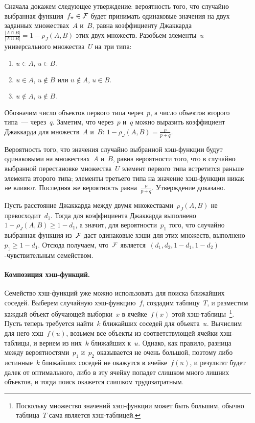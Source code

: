 \documentclass[12pt,fleqn]{article}
\begin{document}
Сначала докажем следующее утверждение: вероятность того, что случайно
выбранная функция~$f_\pi \in \mathcal{F}$ будет принимать одинаковые значения
на двух заданных множествах~$A$ и~$B$, равна коэффициенту
Джаккарда~$\frac{|A \cap B|}{|A \cup B|} = 1 - \rho_J(A, B)$ этих
двух множеств.
Разобьем элементы~$u$ универсального множества~$U$ на три типа:
\begin{enumerate}
    \item $u \in A$, $u \in B$.
    \item $u \in A$, $u \notin B$ или $u \notin A$, $u \in B$.
    \item $u \notin A$, $u \notin B$.
\end{enumerate}
Обозначим число объектов первого типа через~$p$, а число объектов второго типа~--- через~$q$.
Заметим, что через~$p$ и~$q$ можно выразить коэффициент Джаккарда для
множеств~$A$ и~$B$: $1 - \rho_J(A, B) = \frac{p}{p + q}$.

Вероятность того, что значения случайно выбранной хэш-функции будут одинаковыми
на множествах~$A$ и~$B$, равна вероятности того, что в случайно выбранной перестановке
множества~$U$ элемент первого типа встретится раньше элемента второго типа;
элементы третьего типа на значение хэш-функции никак не влияют.
Последняя же вероятность равна~$\frac{p}{p + q}$.
Утверждение доказано.

Пусть расстояние Джаккарда между двумя множествами~$\rho_J(A, B)$
не превосходит~$d_1$.
Тогда для коэффициента Джаккарда выполнено~$1 - \rho_J(A, B) \geq 1 - d_1$,
а значит, для вероятности~$p_1$ того, что случайно выбранная функция из~$\mathcal{F}$ даст
одинаковые хэши для этих множеств, выполнено~$p_1 \geq 1 - d_1$.
Отсюда получаем, что~$\mathcal{F}$ является~$(d_1, d_2, 1 - d_1, 1 - d_2)$-чувствительным семейством.


\paragraph{Композиция хэш-функций.}
Семейство хэш-функций уже можно использовать для поиска ближайших соседей.
Выберем случайную хэш-функцию~$f$, создадим таблицу~$T$,
и разместим каждый объект обучающей выборки~$x$ в ячейке~$f(x)$
этой хэш-таблицы~\footnote{
    Поскольку множество значений хэш-функции может быть большим,
    обычно таблица~$T$ сама является хэш-таблицей.}.
Пусть теперь требуется найти~$k$ ближайших соседей для объекта~$u$.
Вычислим для него хэш~$f(u)$, возьмем все объекты из соответствующей ячейки хэш-таблицы,
и вернем из них~$k$ ближайших к~$u$.
Однако, как правило, разница между вероятностями~$p_1$ и~$p_2$
оказывается не очень большой, поэтому либо истинные~$k$ ближайших соседей
не окажутся в ячейке~$f(u)$, и результат будет далек от оптимального,
либо в эту ячейку попадет слишком много лишних объектов,
и тогда поиск окажется слишком трудозатратным.
\end{document}
